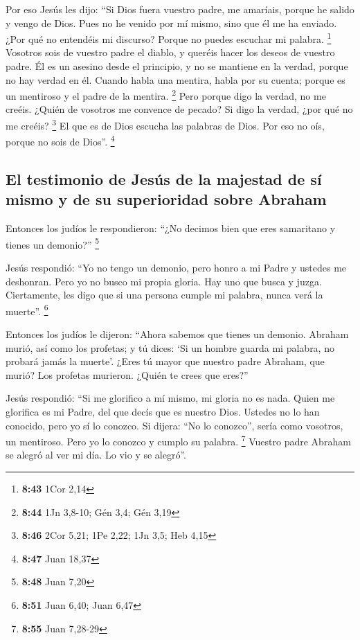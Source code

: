 \begin{paracol}{2}
 Por eso Jesús les dijo: ``Si Dios fuera vuestro padre,
me amaríais, porque he salido y vengo de Dios. Pues no he venido por mí
mismo, sino que él me ha enviado.  ¿Por qué no entendéis
mi discurso? Porque no puedes escuchar mi palabra. \footnote{\textbf{8:43}
  1Cor 2,14}  Vosotros sois de vuestro padre el diablo, y
queréis hacer los deseos de vuestro padre. Él es un asesino desde el
principio, y no se mantiene en la verdad, porque no hay verdad en él.
Cuando habla una mentira, habla por su cuenta; porque es un mentiroso y
el padre de la mentira. \footnote{\textbf{8:44} 1Jn 3,8-10; Gén 3,4; Gén
  3,19}  Pero porque digo la verdad, no me creéis.
 ¿Quién de vosotros me convence de pecado? Si digo la
verdad, ¿por qué no me creéis? \footnote{\textbf{8:46} 2Cor 5,21; 1Pe
  2,22; 1Jn 3,5; Heb 4,15}  El que es de Dios escucha las
palabras de Dios. Por eso no oís, porque no sois de Dios''. \footnote{\textbf{8:47}
  Juan 18,37}

\hypertarget{el-testimonio-de-jesuxfas-de-la-majestad-de-suxed-mismo-y-de-su-superioridad-sobre-abraham}{%
\subsection{El testimonio de Jesús de la majestad de sí mismo y de su
superioridad sobre
Abraham}\label{el-testimonio-de-jesuxfas-de-la-majestad-de-suxed-mismo-y-de-su-superioridad-sobre-abraham}}

 Entonces los judíos le respondieron: ``¿No decimos bien
que eres samaritano y tienes un demonio?'' \footnote{\textbf{8:48} Juan
  7,20}

 Jesús respondió: ``Yo no tengo un demonio, pero honro a
mi Padre y ustedes me deshonran.  Pero yo no busco mi
propia gloria. Hay uno que busca y juzga.  Ciertamente,
les digo que si una persona cumple mi palabra, nunca verá la muerte''.
\footnote{\textbf{8:51} Juan 6,40; Juan 6,47}

 Entonces los judíos le dijeron: ``Ahora sabemos que
tienes un demonio. Abraham murió, así como los profetas; y tú dices: `Si
un hombre guarda mi palabra, no probará jamás la muerte'.
 ¿Eres tú mayor que nuestro padre Abraham, que murió? Los
profetas murieron. ¿Quién te crees que eres?''

 Jesús respondió: ``Si me glorifico a mí mismo, mi gloria
no es nada. Quien me glorifica es mi Padre, del que decís que es nuestro
Dios.  Ustedes no lo han conocido, pero yo sí lo conozco.
Si dijera: ``No lo conozco'', sería como vosotros, un mentiroso. Pero yo
lo conozco y cumplo su palabra. \footnote{\textbf{8:55} Juan 7,28-29}
 Vuestro padre Abraham se alegró al ver mi día. Lo vio y
se alegró''.


\end{paracol}
